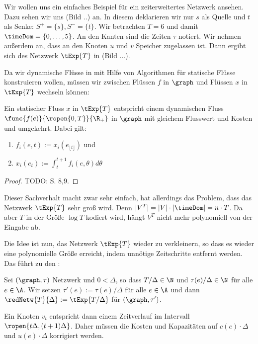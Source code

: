 \begin{example}
    Wir wollen uns ein einfaches Beispiel für ein zeiterweitertes Netzwerk 
    ansehen. Dazu sehen wir uns (Bild ..) an. In diesem deklarieren wir
    nur $s$ als Quelle und $t$ als Senke: $S^+ = \{s\}, S^- = \{t\}$.
    Wir betrachten $T = 6$ und damit $\timeDom = \{0, \ldots, 5\}$. An den
    Kanten sind die Zeiten $\tau$ notiert. Wir nehmen außerdem an, dass
    an den Knoten $u$ und $v$ Speicher zugelassen ist. Dann ergibt sich
    des Netzwerk $\tExp{T}$ in (Bild ...).
\end{example}

Da wir dynamische Flüsse in mit Hilfe von Algorithmen für statische Flüsse
konstruieren wollen, müssen wir zwischen Flüssen $f$ in $\graph$ und
Flüssen $x$ in $\tExp{T}$ wechseln können:

\begin{lemma}\label{lem:static_dyn_conv}
    Ein statischer Fluss $x$ in $\tExp{T}$ entspricht einem dynamischen Fluss
    $\func{f(e)}{\ropen{0,T}}{\R_+}$ in $\graph$ mit gleichem Flusswert und Kosten
    und umgekehrt. Dabei gilt:
    \begin{enumerate}
        \item $f_i(e,t) := x_i(e_{\lfloor t \rfloor})$ und
        \item $x_i(e_t) := \int_t^{t+1} f_i(e, \theta) d\theta$
    \end{enumerate}
        
    
    \begin{proof}
        TODO: S. 8,9.
    \end{proof}
\end{lemma}

Dieser Sachverhalt macht zwar sehr einfach, hat allerdings das Problem, dass das
Netzwerk $\tExp{T}$ sehr groß wird. Denn $|V^T| = |V| \cdot |\timeDom| = n \cdot T$.
Da aber $T$ in der Größe $\log T$ kodiert wird, hängt $V^T$ nicht mehr polynomiell
von der Eingabe ab.

Die Idee ist nun, das Netzwerk $\tExp{T}$ wieder zu verkleinern, so dass es wieder
eine polynomielle Größe erreicht, indem unnötige Zeitschritte entfernt werden.
Das führt zu den :

\begin{definition}
    Sei $(\graph, \tau)$ Netzwerk und $0 < \Delta$, so dass $T/\Delta \in \N$
    und $\tau(e)/\Delta \in \N$ für alle $e \in \A$. Wir setzen
    $\tau'(e) := \tau(e)/\Delta$ für alle $e \in \A$
    und dann $\redNetw{T}{\Delta} := \tExp{T/\Delta}$ für $(\graph, \tau')$.
    
    Ein Knoten $v_t$ entspricht dann einem Zeitverlauf im Intervall
    $\ropen{t \Delta, (t+1) \Delta}$. Daher müssen die Kosten und Kapazitäten
    auf $c(e) \cdot \Delta$ und $u(e) \cdot \Delta$ korrigiert werden.
\end{definition}

